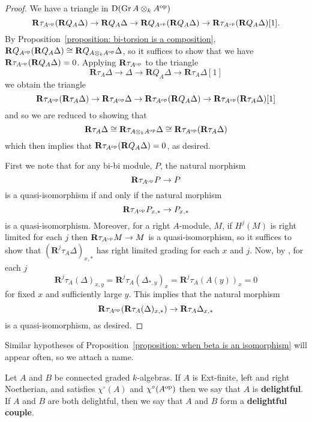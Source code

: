 \begin{proof}
  We have a triangle in \(\mathrm{D}(\operatorname{Gr}A \otimes_k A^{\operatorname{op}})\)
  \[\mathbf{R}\tau_{A^{\operatorname{op}}} (\mathbf{R}Q_A \Delta) \to \mathbf{R}Q_A \Delta \to \mathbf{R}Q_{A^{\operatorname{op}}} (\mathbf{R}Q_A \Delta) \to \mathbf{R}\tau_{A^{\operatorname{op}}} (\mathbf{R}Q_A \Delta)[1].\]
  By Proposition~\ref{proposition: bi-torsion is a composition}, \(\mathbf{R}Q_{A^{\operatorname{op}}}(\mathbf{R}Q_A \Delta) \cong \mathbf{R}Q_{A \otimes_k A^{\operatorname{op}}} \Delta\), so it suffices to show that we have \(\mathbf{R}\tau_{A^{\operatorname{op}}}(\mathbf{R}Q_A \Delta) = 0\).
  Applying \(\mathbf{R}\tau_{A^{\operatorname{op}}}\) to the triangle
  \[\mathbf{R}\tau_A \Delta \to \Delta \to \mathbf{R}Q_A \Delta \to \mathbf{R}\tau_A \Delta[1]\]
  we obtain the triangle
  \[\mathbf{R}\tau_{A^{\operatorname{op}}} (\mathbf{R}\tau_A \Delta) \to \mathbf{R}\tau_{A^{\operatorname{op}}} \Delta \to \mathbf{R}\tau_{A^{\operatorname{op}}} (\mathbf{R}Q_A \Delta) \to \mathbf{R}\tau_{A^{\operatorname{op}}} (\mathbf{R}\tau_A \Delta)[1]\]
  and so we are reduced to showing that
  \[\mathbf{R}\tau_A \Delta \cong \mathbf{R}\tau_{A \otimes_k A^{\operatorname{op}}}\Delta \cong \mathbf{R}\tau_{A^{\operatorname{op}}} (\mathbf{R}\tau_A \Delta)\]
  which then implies that \(\mathbf{R}\tau_{A^{\operatorname{op}}}(\mathbf{R}Q_A \Delta) = 0\), as desired.

  First we note that for any bi-bi module, \(P\), the natural morphism
  \[\mathbf{R}\tau_{A^{\operatorname{op}}} P \to P\]
  is a quasi-isomorphism if and only if the natural morphism
  \[\mathbf{R}\tau_{A^{\operatorname{op}}} P_{x,\ast} \to P_{x,\ast}\]
  is a quasi-isomorphism.
  Moreover, for a right \(A\)-module, \(M\), if \(H^j(M)\) is right limited for each \(j\) then \(\mathbf{R} \tau_{A^{\operatorname{op}}} M \to M\) is a quasi-isomorphism,
  so it suffices to show that \((\mathbf{R}^j \tau_A \Delta)_{x,\ast}\) has right limited grading for each \(x\) and \(j\).
  Now, by \textcite[Cor. 3.6 (3)]{AZ94}, for each \(j\)
  \[\mathbf{R}^j\tau_A(\Delta)_{x,y} = \mathbf{R}^j\tau_A(\Delta_{\ast,y})_x = \mathbf{R}^j\tau_A(A(y))_x = 0\]
  for fixed \(x\) and sufficiently large \(y\).
  This implies that the natural morphism
  \[\mathbf{R}\tau_{A^{\operatorname{op}}}(\mathbf{R}\tau_A(\Delta)_{x,\ast}) \to \mathbf{R}\tau_A\Delta_{x,\ast}\]
  is a quasi-isomorphism, as desired.
\end{proof}

Similar hypotheses of Proposition~\ref{proposition: when beta is an isomorphism} will appear often, so we attach a name. 

\begin{definition} \label{definition: delightful couple}
  Let \(A\) and \(B\) be connected graded \(k\)-algebras. If \(A\) is Ext-finite, left and right Noetherian, and satisfies \(\chi^\circ(A)\) and \(\chi^\circ(A^{\operatorname{op}})\) then we say that \(A\) is \textbf{delightful}. If \(A\) and \(B\) are both delightful, then we say that \(A\) and \(B\) form a \textbf{delightful couple}. 
\end{definition}
